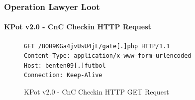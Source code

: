 \documentclass[aspectratio=169]{beamer}
\begin{document}
{
\begin{frame}[fragile]
  \frametitle{Operation Lawyer Loot}
  \framesubtitle{KPot v2.0 - CnC Checkin HTTP Request}
\begin{figure}
\small{
\begin{verbatim}
GET /BOH9KGa4jvUsU4jL/gate[.]php HTTP/1.1
Content-Type: application/x-www-form-urlencoded
Host: benten09[.]futbol
Connection: Keep-Alive
\end{verbatim}
}
\caption{KPot v2.0 - CnC Checkin HTTP GET Request}
\end{figure}
\end{frame}
}
\end{document}
